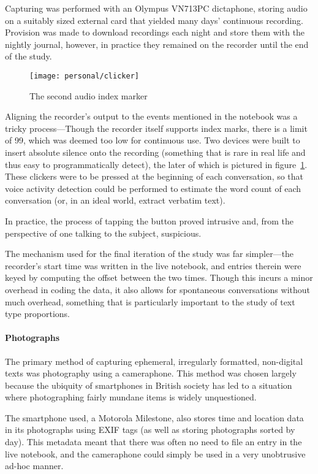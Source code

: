 Capturing was performed with an Olympus VN713PC dictaphone, storing audio on a suitably sized external card that yielded many days' continuous recording.  Provision was made to download recordings each night and store them with the nightly journal, however, in practice they remained on the recorder until the end of the study.


\begin{figure}[p]
    \centering
    \texttt{[image: personal/clicker]}
    \caption{The second audio index marker}
    \label{fig:personal:clicker}
\end{figure}


Aligning the recorder's output to the events mentioned in the notebook was a tricky process---Though the recorder itself supports index marks, there is a limit of 99, which was deemed too low for continuous use.  Two devices were built to insert absolute silence onto the recording (something that is rare in real life and thus easy to programmatically detect), the later of which is pictured in figure~\ref{fig:personal:clicker}.  These clickers were to be pressed at the beginning of each conversation, so that voice activity detection could be performed to estimate the word count of each conversation (or, in an ideal world, extract verbatim text).

In practice, the process of tapping the button proved intrusive and, from the perspective of one talking to the subject, suspicious.

The mechanism used for the final iteration of the study was far simpler---the recorder's start time was written in the live notebook, and entries therein were keyed by computing the offset between the two times.  Though this incurs a minor overhead in coding the data, it also allows for spontaneous conversations without much overhead, something that is particularly important to the study of text type proportions.



\paragraph{Photographs}
The primary method of capturing ephemeral, irregularly formatted, non-digital texts was photography using a cameraphone.  This method was chosen largely because the ubiquity of smartphones in British society has led to a situation where photographing fairly mundane items is widely unquestioned.

The smartphone used, a Motorola Milestone, also stores time and location data in its photographs using EXIF tags (as well as storing photographs sorted by day).  This metadata meant that there was often no need to file an entry in the live notebook, and the cameraphone could simply be used in a very unobtrusive ad-hoc manner.


